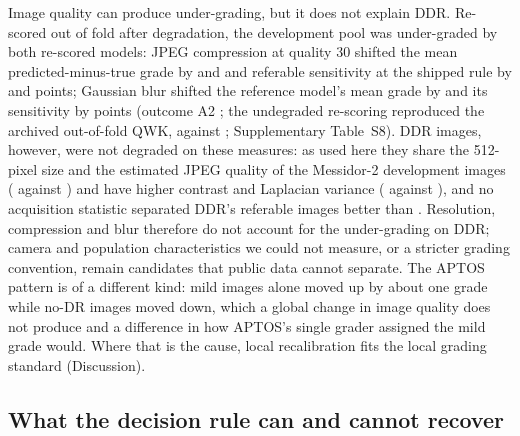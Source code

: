 Image quality can produce under-grading, but it does not explain DDR. Re-scored out of fold after
degradation, the development pool was under-graded by both re-scored models: JPEG compression at
quality 30 shifted the mean predicted-minus-true grade by  and
 and referable sensitivity at the shipped rule by
 and  points; Gaussian blur shifted the
reference model's mean grade by  and its sensitivity by
 points (outcome A2 ; the undegraded re-scoring
reproduced the archived out-of-fold QWK,  against ;
Supplementary Table~S8). DDR images, however, were not degraded on these measures: as used here they
share the 512-pixel size and the estimated JPEG quality of the Messidor-2 development images ( against
) and have higher contrast and Laplacian variance (
against ), and no acquisition statistic separated DDR's referable images
better than . Resolution, compression and blur therefore do not account for
the under-grading on DDR; camera and population characteristics we could not measure, or a stricter
grading convention, remain candidates that public data cannot separate. The APTOS pattern is of a
different kind: mild images alone moved up by about one grade while no-DR images moved down, which a
global change in image quality does not produce and a difference in how APTOS's single grader
assigned the mild grade would. Where that is the cause, local recalibration fits the local grading
standard (Discussion).

\subsection{What the decision rule can and cannot recover}

